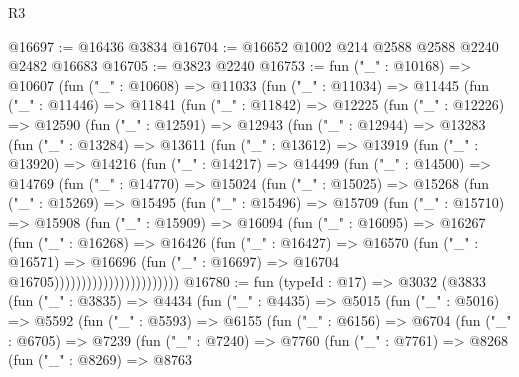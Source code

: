 \begin{lexlean}{R3}
\begin{coremodule}
@16697 := @16436 @3834
@16704 := @16652 @1002 @214 @2588 @2588 @2240 @2482 @16683
@16705 := @3823 @2240
@16753 := fun ("_" : @10168) =>
  @10607
    (fun ("_" : @10608) =>
    @11033
      (fun ("_" : @11034) =>
      @11445
        (fun ("_" : @11446) =>
        @11841
          (fun ("_" : @11842) =>
          @12225
            (fun ("_" : @12226) =>
            @12590
              (fun ("_" : @12591) =>
              @12943
                (fun ("_" : @12944) =>
                @13283
                  (fun ("_" : @13284) =>
                  @13611
                    (fun ("_" : @13612) =>
                    @13919
                      (fun ("_" : @13920) =>
                      @14216
                        (fun ("_" : @14217) =>
                        @14499
                          (fun ("_" : @14500) =>
                          @14769
                            (fun ("_" : @14770) =>
                            @15024
                              (fun ("_" : @15025) =>
                              @15268
                                (fun ("_" : @15269) =>
                                @15495
                                  (fun ("_" : @15496) =>
                                  @15709
                                    (fun ("_" : @15710) =>
                                    @15908
                                      (fun ("_" : @15909) =>
                                      @16094
                                        (fun ("_" : @16095) =>
                                        @16267
                                          (fun ("_" : @16268) =>
                                          @16426
                                            (fun ("_" : @16427) =>
                                            @16570
                                              (fun ("_" : @16571) =>
                                              @16696
                                                (fun ("_" : @16697) =>
                                                @16704 @16705)))))))))))))))))))))))
@16780 := fun (typeId : @17) =>
  @3032
    (@3833
      (fun ("_" : @3835) =>
      @4434
        (fun ("_" : @4435) =>
        @5015
          (fun ("_" : @5016) =>
          @5592
            (fun ("_" : @5593) =>
            @6155
              (fun ("_" : @6156) =>
              @6704
                (fun ("_" : @6705) =>
                @7239
                  (fun ("_" : @7240) =>
                  @7760
                    (fun ("_" : @7761) =>
                    @8268
                      (fun ("_" : @8269) =>
                      @8763

\end{coremodule}
\end{lexlean}
